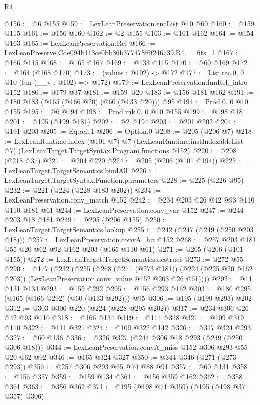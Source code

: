\begin{lexlean}{R4}
\begin{coremodule}
@156 := @6 @155
@159 := LexLeanPreservation.encList @10 @60
@160 := @159 @115
@161 := @156 @160
@162 := @2 @155
@163 := @161 @162
@164 := @154 @163
@165 := LexLeanPreservation.Rel
@166 := LexLeanPreserve.Cde094b113ce0bb36b377478f6f246739.R4.__fits_1
@167 := @166 @115
@168 := @165 @167
@169 := @133 @115
@170 := @60 @169
@172 := @164 (@168 @170)
@173 := (values : @102) -> @172
@177 := List.rec.{0, 0} @10 (fun (__v : @102) => @172)
@179 := LexLeanPreservation.funRel_intro @152
@180 := @179 @37
@181 := @159 @20
@183 := @156 @181 @162
@191 := @180 @183 (@165 (@166 @20) (@60 (@133 @20))) @95
@194 := Prod.{0, 0} @10 @155
@195 := @6 @194
@198 := Prod.mk.{0, 0} @10 @155
@199 := @198 @18
@201 := @195 (@199 @181)
@202 := @2 @194
@203 := @201 @202
@204 := @191 @203
@205 := Eq.refl.{1}
@206 := Option.{0}
@208 := @205 (@206 @7)
@218 := LexLeanRuntime.index
    (@101 @7)
    @7
    (LexLeanRuntime.instIndexableList @7)
    (LexLeanTarget.TargetSyntax.Program.functions @152)
@220 := @208 (@218 @37)
@221 := @204 @220
@224 := @205 (@206 (@101 @194))
@225 := LexLeanTarget.TargetSemantics.bindAll
@226 := LexLeanTarget.TargetSyntax.Function.parameters
@228 := @225 (@226 @95)
@232 := @221 (@224 (@228 @183 @202))
@234 := LexLeanPreservation.conv_match @152
@242 := @234 @203 @26 @42 @93 @110 @110 @181 @61
@244 := LexLeanPreservation.conv_var @152
@247 := @244 @203 @18 @181
@249 := @205 (@206 @155)
@250 := LexLeanTarget.TargetSemantics.lookup
@255 := @242 (@247 (@249 (@250 @203 @18)))
@257 := LexLeanPreservation.convA_hit @152
@268 := @257 @203 @181 @55 @20 @62 @92 @162 @203 (@165 @110 @61)
@271 := @205 (@206 (@101 @155))
@272 := LexLeanTarget.TargetSemantics.destruct
@273 := @272 @55
@290 := @177
    (@232
      (@255
        (@268
          (@271 (@273 @181))
          (@224 (@225 @20 @162 @203))
          (LexLeanPreservation.conv_value @152 @203 @26 @61))))
@292 := @11 @131 @134
@293 := @159 @292
@295 := @156 @293 @162
@303 := @180 @295 (@165 (@166 @292) (@60 (@133 @292))) @95
@306 := @195 (@199 @293) @202
@312 := @303 @306 @220 (@224 (@228 @295 @202))
@317 := @234 @306 @26 @42 @93 @110
@318 := @166 @134
@319 := @114 @318
@321 := @109 @319 @110
@322 := @111 @321
@324 := @109 @322 @142
@326 := @317 @324 @293
@327 := @60 @136
@336 := @326 @327 (@244 @306 @18 @293 (@249 (@250 @306 @18)))
@344 := LexLeanPreservation.convA_miss @152 @306 @293 @55 @20 @62 @92
@346 := @165 @324 @327
@350 := @344 @346 (@271 (@273 @293))
@356 := @257 @306 @293 @65 @74 @88 @91
@357 := @60 @131
@358 := @156 @357
@359 := @159 @134
@361 := @156 @359 @162
@362 := @358 @361
@363 := @356 @362
@371 := @195 (@198 @71 @359) (@195 (@198 @37 @357) @306)

\end{coremodule}
\end{lexlean}
